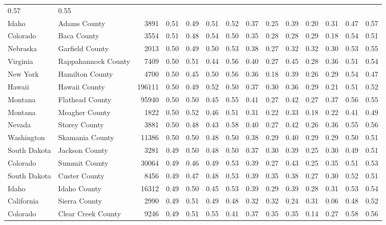 \documentclass[10pt, letterpaper]{article}
\begin{document}
\begin{spacing}{1.4}
\begin{table}
{\begin{tabular}{llrrrrrrrrrrrr}
    0.57 & 0.55 \\ Idaho & Adams County & 3891 & 0.51 & 0.49 &
    0.51 & 0.52 & 0.37 & 0.25 & 0.39 & 0.20 & 0.31 &
    0.47 & 0.57 \\ Colorado & Baca County & 3554 & 0.51 & 0.48 &
    0.54 & 0.50 & 0.35 & 0.28 & 0.28 & 0.29 & 0.18 &
    0.54 & 0.51 \\ Nebraska & Garfield County & 2013 & 0.50 &
    0.49 & 0.50 & 0.53 & 0.38 & 0.27 & 0.32 & 0.32 &
    0.30 & 0.53 & 0.55 \\ Virginia & Rappahannock County & 7409 &
    0.50 & 0.51 & 0.44 & 0.56 & 0.40 & 0.27 & 0.45 &
    0.28 & 0.36 & 0.51 & 0.54 \\ New York & Hamilton County &
    4700 & 0.50 & 0.45 & 0.50 & 0.56 & 0.36 & 0.18 &
    0.39 & 0.26 & 0.29 & 0.54 & 0.47 \\ Hawaii & Hawaii
    County & 196111 & 0.50 & 0.49 & 0.52 & 0.50 & 0.37 &
    0.30 & 0.36 & 0.29 & 0.21 & 0.51 & 0.52 \\ Montana &
    Flathead County & 95940 & 0.50 & 0.50 & 0.45 & 0.55 &
    0.41 & 0.27 & 0.42 & 0.27 & 0.37 & 0.56 & 0.55
    \\ Montana & Meagher County & 1822 & 0.50 & 0.52 & 0.46 &
    0.51 & 0.31 & 0.22 & 0.33 & 0.18 & 0.22 & 0.41 &
    0.49 \\ Nevada & Storey County & 3881 & 0.50 & 0.48 & 0.43 &
    0.58 & 0.40 & 0.27 & 0.42 & 0.26 & 0.36 & 0.55 &
    0.56 \\ Washington & Skamania County & 11386 & 0.50 & 0.50 &
    0.48 & 0.50 & 0.38 & 0.29 & 0.40 & 0.29 & 0.29 &
    0.50 & 0.51 \\ South Dakota & Jackson County & 3281 & 0.49 &
    0.50 & 0.48 & 0.50 & 0.37 & 0.30 & 0.39 & 0.25 &
    0.30 & 0.49 & 0.51 \\ Colorado & Summit County & 30064 &
    0.49 & 0.46 & 0.49 & 0.53 & 0.39 & 0.27 & 0.43 &
    0.25 & 0.35 & 0.51 & 0.53 \\ South Dakota & Custer County &
    8456 & 0.49 & 0.47 & 0.48 & 0.53 & 0.39 & 0.35 &
    0.38 & 0.27 & 0.30 & 0.52 & 0.51 \\ Idaho & Idaho County
    & 16312 & 0.49 & 0.50 & 0.45 & 0.53 & 0.39 & 0.29 &
    0.39 & 0.28 & 0.31 & 0.53 & 0.54 \\ California & Sierra
    County & 2990 & 0.49 & 0.51 & 0.49 & 0.48 & 0.32 &
    0.32 & 0.24 & 0.31 & 0.06 & 0.48 & 0.52 \\ Colorado
    & Clear Creek County & 9246 & 0.49 & 0.51 & 0.55 & 0.41 &
    0.37 & 0.35 & 0.35 & 0.14 & 0.27 & 0.58 & 0.56

\end{tabular}}
\end{table}
\end{spacing}
\end{document}
